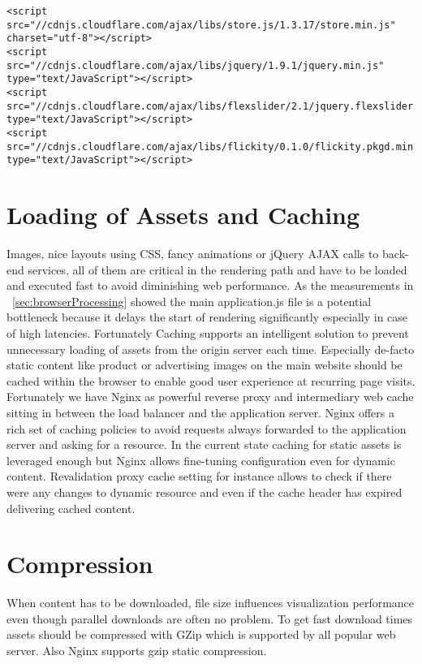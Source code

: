 \begin{lstlisting}[caption=Loading JavaScript libraries from Cloudfare CDN]
<script src="//cdnjs.cloudflare.com/ajax/libs/store.js/1.3.17/store.min.js" charset="utf-8"></script>
<script src="//cdnjs.cloudflare.com/ajax/libs/jquery/1.9.1/jquery.min.js" type="text/JavaScript"></script>
<script src="//cdnjs.cloudflare.com/ajax/libs/flexslider/2.1/jquery.flexslider.js" type="text/JavaScript"></script>
<script src="//cdnjs.cloudflare.com/ajax/libs/flickity/0.1.0/flickity.pkgd.min.js" type="text/JavaScript"></script>
\end{lstlisting}

\section{Loading of Assets and Caching}

Images, nice layouts using CSS, fancy animations or jQuery AJAX calls to back-end services, all of them are critical in the rendering path and have to be loaded and executed fast to avoid diminishing web performance. 
As the measurements in ~\ref{sec:browserProcessing} showed the main application.js file is a potential bottleneck because it delays the start of rendering significantly especially in case of high latencies. Fortunately Caching supports an intelligent solution to prevent unnecessary loading of assets from the origin server each time. Especially de-facto static content like product or advertising images on the main website should be cached within the browser to enable good user experience at recurring page visits. Fortunately we have Nginx as powerful reverse proxy and intermediary web cache sitting in between the load balancer and the application server. Nginx offers a rich set of caching policies to avoid requests always forwarded to the application server and asking for a resource. In the current state caching for static assets is leveraged enough but Nginx allows fine-tuning configuration even for dynamic content. Revalidation proxy cache setting for instance allows to check if there were any changes to dynamic resource and even if the cache header has expired delivering cached content. 
 
\section{Compression}

When content has to be downloaded, file size influences visualization performance even though parallel downloads are often no problem. To get fast download times assets should be compressed with GZip which is supported by all popular web server. Also Nginx supports gzip static compression.


